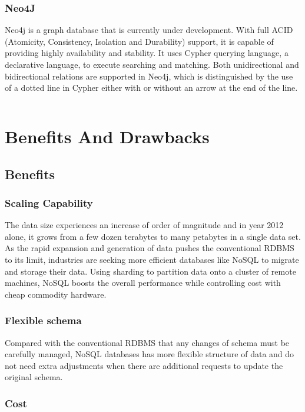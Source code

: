 \subsubsection{Neo4J}\mbox{}

Neo4j is a graph database that is currently under development. With full ACID (Atomicity, Consistency, Isolation and
Durability)\cite{neo} support, it is capable of providing highly availability and stability. It uses Cypher querying language, a declarative language, to execute searching and matching. Both unidirectional and bidirectional relations are supported in Neo4j, which is distinguished by the use of a dotted line in Cypher either with or without an arrow at the end of the line.

\[\]
\section{Benefits And Drawbacks}

\subsection{Benefits}

\subsubsection{Scaling Capability}\mbox{}

The
data size experiences an increase of order of magnitude and in year 2012 alone, it grows from a few dozen
terabytes to many petabytes in a single data set\cite{DBLP:journals/corr/Sharma15b}.
As the rapid expansion and generation of data pushes the conventional RDBMS to its limit, industries are seeking more efficient databases like NoSQL to migrate and storage their data.
Using sharding to partition data onto a cluster of remote machines, NoSQL boosts the overall performance while controlling cost with cheap commodity hardware.


\subsubsection{Flexible schema} \mbox{}

Compared with the conventional RDBMS that any changes of schema must be carefully managed, NoSQL databases has more flexible structure of data and do not need extra adjustments when there are additional requests to update the original schema. 


\subsubsection{Cost}\mbox{}

